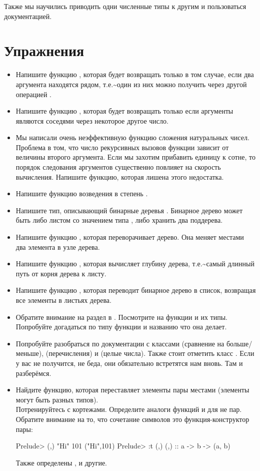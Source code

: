 Также мы научились приводить одни численные типы к другим и пользоваться
документацией.

\section{Упражнения}

\begin{itemize}
\item
  Напишите функцию , которая будет
  возвращать  только в том случае, если два аргумента находятся
  рядом, т.е.\textasciitilde{}один из них можно получить через другой
  операцией .
\item
  Напишите функцию , которая будет
  возвращать  только если аргументы являются соседями через
  некоторое другое число.
\item
  Мы написали очень неэффективную функцию сложения натуральных чисел.
  Проблема в том, что число рекурсивных вызовов функции зависит от
  величины второго аргумента. Если мы захотим прибавить единицу к сотне,
  то порядок следования аргументов существенно повлияет на скорость
  вычисления. Напишите функцию, которая лишена этого недостатка.
\item
  Напишите функцию возведения в степень .
\item
  Напишите тип, описывающий бинарные деревья . Бинарное
  дерево может быть либо листом со значением типа , либо хранить
  два поддерева.
\item
  Напишите функцию , которая
  переворачивает дерево. Она меняет местами два элемента в узле дерева.
\item
  Напишите функцию , которая вычисляет
  глубину дерева, т.е.\textasciitilde{}самый длинный путь от корня
  дерева к листу.
\item
  Напишите функцию , которая переводит
  бинарное дерево в список, возвращая все элементы в листьях дерева.
\item
  Обратите внимание на раздел  в .
  Посмотрите на функции и их типы. Попробуйте догадаться по типу функции
  и названию что она делает.
\item
  Попробуйте разобраться по документации с классами  (сравнение
  на больше/меньше),  (перечисления) и  (целые
  числа). Также стоит отметить класс . Если у вас не
  получится, не беда, они обязательно встретятся нам вновь. Там и
  разберёмся.
\item
  Найдите функцию, которая переставляет элементы пары местами (элементы
  могут быть разных типов).\\ Потренируйтесь с кортежами. Определите
  аналоги функций  и  для не пар. Обратите внимание на
  то, что сочетание символов \In{(,)} это функция-конструктор пары:


  \begin{code}
  Prelude> (,) "Hi" 101
  ("Hi",101)
  Prelude> :t (,)
  (,) :: a -> b -> (a, b)
  \end{code}

  Также определены \In{(,,)}, \In{(,,,)} и другие.
\end{itemize}
